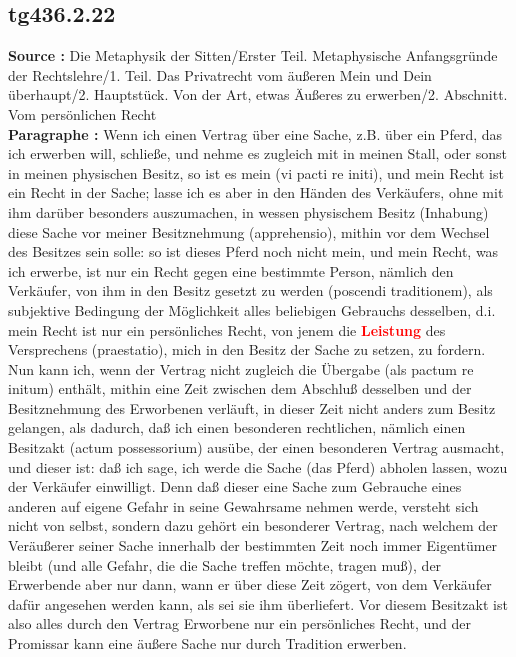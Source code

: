 \documentclass[a4paper,12pt,twoside]{book}
\newcommand{\match}[1]{\textcolor{red}{\textbf{#1}}}
\begin{document}
	\subsection*{tg436.2.22} 
	\textbf{Source : }Die Metaphysik der Sitten/Erster Teil. Metaphysische Anfangsgründe der Rechtslehre/1. Teil. Das Privatrecht vom äußeren Mein und Dein überhaupt/2. Hauptstück. Von der Art, etwas Äußeres zu erwerben/2. Abschnitt. Vom persönlichen Recht\\  
	
	\textbf{Paragraphe : }Wenn ich einen Vertrag über eine Sache, z.B. über ein Pferd, das ich erwerben will, schließe, und nehme es zugleich mit in meinen Stall, oder sonst in meinen physischen Besitz, so ist es mein (vi pacti re initi), und mein Recht ist ein Recht in der Sache; lasse ich es aber in den Händen des Verkäufers, ohne mit ihm darüber besonders auszumachen, in wessen physischem Besitz (Inhabung) diese Sache vor meiner Besitznehmung (apprehensio), mithin vor dem Wechsel des Besitzes sein solle: so ist dieses Pferd noch nicht mein, und mein Recht, was ich erwerbe, ist nur ein Recht gegen eine bestimmte Person, nämlich den Verkäufer, von ihm in den Besitz gesetzt zu werden (poscendi traditionem), als subjektive Bedingung der Möglichkeit alles beliebigen Gebrauchs desselben, d.i. mein Recht ist nur ein persönliches Recht, von jenem die \match{Leistung} des Versprechens (praestatio), mich in den Besitz der Sache zu setzen, zu fordern. Nun kann ich, wenn der Vertrag nicht zugleich die Übergabe (als pactum re initum) enthält, mithin eine Zeit zwischen dem Abschluß desselben und der Besitznehmung des Erworbenen verläuft, in dieser Zeit nicht anders zum Besitz gelangen, als dadurch, daß ich einen besonderen rechtlichen, nämlich einen Besitzakt (actum possessorium) ausübe, der einen besonderen Vertrag ausmacht, und dieser ist: daß ich sage, ich werde die Sache (das Pferd) abholen lassen, wozu der Verkäufer einwilligt. Denn daß dieser eine Sache zum Gebrauche eines anderen auf eigene Gefahr in seine Gewahrsame nehmen werde, versteht sich nicht von selbst, sondern dazu gehört ein besonderer Vertrag, nach welchem der Veräußerer seiner Sache innerhalb der bestimmten Zeit noch immer Eigentümer bleibt (und alle Gefahr, die die Sache treffen möchte, tragen muß), der Erwerbende aber nur dann, wann er über diese Zeit zögert, von dem Verkäufer dafür angesehen werden kann, als sei sie ihm überliefert. Vor diesem Besitzakt ist also alles durch den Vertrag Erworbene nur ein persönliches Recht, und der Promissar kann eine äußere Sache nur durch Tradition erwerben. 
	
\end{document}
